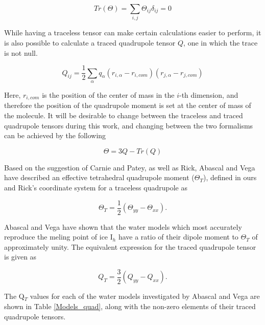 \documentclass[aps, jcp, prl, reprint, groupedaddress, superscriptaddress, twocolumn]{revtex4-1}
\begin{document}
\begin{equation}
Tr(\Theta) = \sum_{i,j}\Theta_{ij}\delta_{ij} = 0
\end{equation}

While having a traceless tensor can make certain calculations easier to 
perform, it is also possible to calculate a traced quadrupole tensor $Q$, one
in which the trace is not null.

\begin{equation}
Q_{ij} = \frac{1}{2}\sum_{\alpha}q_{\alpha}(r_{i,\alpha}-r_{i,com})(r_{j,\alpha}-r_{j,com})
\end{equation}

Here, $r_{i,com}$ is the position of the center of mass in the $i$-th 
dimension, and therefore the position of the quadrupole moment is set at the 
center of mass of the molecule. It will be desirable to change between the
traceless and traced quadrupole tensors during this work, and changing 
between the two formalisms can be achieved by the following

\begin{equation}
\Theta = 3Q - Tr(Q)
\end{equation}    

Based on the suggestion of Carnie and Patey\cite{Carnie82}, 
as well as Rick\cite{Rick04}, Abascal and Vega have described an effective 
tetrahedral quadrupole moment ($\Theta_T$), defined in ours and Rick's 
coordinate 
system for a traceless quadrupole as

\begin{equation}
\Theta_{T} = \frac{1}{2}(\Theta_{yy} - \Theta_{xx}).
\end{equation} 

Abascal and Vega have shown that the water models which most accurately
reproduce the meling point of ice I$_h$ have a ratio of their dipole moment
to $\Theta_T$ of approximately unity. The equivalent expression for the 
traced quadrupole tensor is given as

\begin{equation}
Q_{T} = \frac{3}{2}(Q_{yy} - Q_{xx}).
\end{equation}
 
The Q$_T$ values for each of the water models
investigated by Abascal and Vega are shown in Table \ref{Models_quad}, along 
with the non-zero elements of their traced quadrupole tensors.
\end{document}
